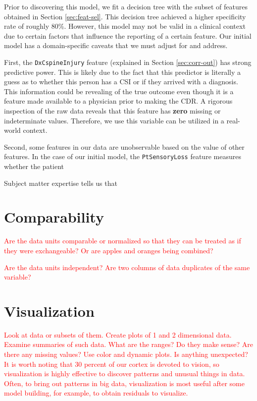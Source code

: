 \documentclass[
]{article}
\begin{document}
Prior to discovering this model, we fit a decision tree with the subset
of features obtained in Section \textcolor{blue}{\ref{sec:feat-sel}}.
This decision tree achieved a higher specificity rate of roughly 80\%.
However, this model may not be valid in a clinical context due to
certain factors that influence the reporting of a certain feature. Our
initial model has a domain-specific caveats that we must adjust for and
address.

First, the \texttt{DxCspineInjury} feature (explained in Section
\textcolor{blue}{\ref{sec:corr-out}}) has strong predictive power. This
is likely due to the fact that this predictor is literally a guess as to
whether this person has a CSI or if they arrived with a diagnosis. This
information could be revealing of the true outcome even though it is a
feature made available to a physician prior to making the CDR. A
rigorous inspection of the raw data reveals that this feature has
\textbf{zero} missing or indeterminate values. Therefore, we use this
variable can be utilized in a real-world context.

Second, some features in our data are unobservable based on the value of
other features. In the case of our initial model, the
\texttt{PtSensoryLoss} feature measures whether the patient

Subject matter expertise tells us that

\hypertarget{comparability}{%
\section{Comparability}\label{comparability}}

\textcolor{red}{Are the data units comparable or normalized so that they can be treated as if they were exchangeable? Or are apples and oranges being combined?}

\textcolor{red}{Are the data units independent? Are two columns of data duplicates of the same variable?}

\hypertarget{visualization}{%
\section{Visualization}\label{visualization}}

\textcolor{red}{Look at data or subsets of them. Create plots of 1 and 2 dimensional data. Examine summaries of such data. What are the ranges? Do they make sense? Are there any missing values? Use color and dynamic plots. Is anything unexpected? It is worth noting that 30 percent of our cortex is devoted to vision, so visualization is highly effective to discover patterns and unusual things in data. Often, to bring out patterns in big data, visualization is most useful after some model building, for example, to obtain residuals to visualize.}
\end{document}
